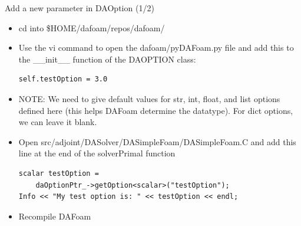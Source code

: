 \documentclass{bredelebeamer}
\begin{document}
\begin{frame}[fragile]{Add a new parameter in DAOption (1/2)}

\begin{itemize}
  \item cd into \$HOME/dafoam/repos/dafoam/
  \item Use the vi command to open the dafoam/pyDAFoam.py file and add this to the \_\_init\_\_ function of the DAOPTION class:
 \begin{lstlisting}
self.testOption = 3.0
 \end{lstlisting}
 \item NOTE: We need to give default values for str, int, float, and list options defined here (this helps DAFoam determine the datatype). For dict options, we can leave it blank.
 \item Open src/adjoint/DASolver/DASimpleFoam/DASimpleFoam.C and add this line at the end of the solverPrimal function
 \begin{lstlisting}
scalar testOption = 
    daOptionPtr_->getOption<scalar>("testOption");
Info << "My test option is: " << testOption << endl;
 \end{lstlisting}
 \item Recompile DAFoam

\end{itemize}

\end{frame}
\end{document}
